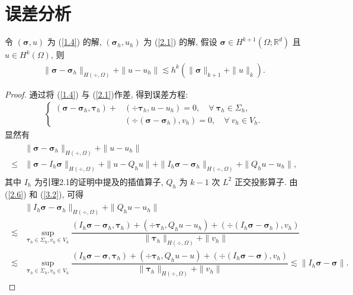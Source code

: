 \section{误差分析}
\begin{theorem}\label{th3.1}
令 $(\boldsymbol\sigma, u)$ 为 (\ref{1.4}) 的解, $(\boldsymbol\sigma_h, u_h)$ 为 (\ref{2.1}) 的解, 假设 $\boldsymbol\sigma\in H^{k+1}(\Omega;\mathbb{R}^d)$ 且 $u\in H^{k}(\Omega)$, 则
\begin{align}
\label{3.1}
\|\boldsymbol\sigma-\boldsymbol\sigma_h\|_{H(\div,\Omega)}+\|u-u_h\|\lesssim h^k(\|\boldsymbol\sigma\|_{k+1}+\|u\|_k).
\end{align}
\end{theorem}
\begin{proof}
通过将 (\ref{1.4}) 与 (\ref{2.1})作差, 得到误差方程:
\begin{align}
\label{3.2}
\left\{
\begin{array}{ll}
(\boldsymbol\sigma-\boldsymbol\sigma_h, \boldsymbol\tau_h)+&(\div\boldsymbol\tau_h, u-u_h) = 0, \quad \forall \ \boldsymbol\tau_h\in\Sigma_h, \\
&(\div(\boldsymbol\sigma-\boldsymbol\sigma_h), v_h) = 0, \quad \forall \ v_h\in V_h.
\end{array}
\right.
\end{align}
显然有
\begin{align}\begin{split}
\label{3.3}
&\|\boldsymbol\sigma-\boldsymbol\sigma_h\|_{H(\div,\Omega)}+\|u-u_h\|\\
\leq&\|\boldsymbol\sigma-I_h\boldsymbol\sigma\|_{H(\div,\Omega)}+\|u-Q_h u\|+\|I_h\boldsymbol\sigma-\boldsymbol\sigma_h\|_{H(\div,\Omega)}+\|Q_h u-u_h\|,
\end{split}
\end{align}
其中 $I_h$ 为引理2.1的证明中提及的插值算子, $Q_h$ 为 $k-1$ 次 $L^2$ 正交投影算子. 由 (\ref{2.6}) 和 (\ref{3.2}), 可得
\begin{align}\begin{split}
\label{3.4}
&\|I_h\boldsymbol\sigma-\boldsymbol\sigma_h\|_{H(\div,\Omega)}+\|Q_h u-u_h\|\\
\lesssim&\sup_{\boldsymbol\tau_h\in \Sigma_h, v_h\in V_h}\dfrac{(I_h\boldsymbol\sigma-\boldsymbol\sigma_h,\boldsymbol\tau_h)+(\div\boldsymbol\tau_h, Q_h u-u_h)+(\div(I_h\boldsymbol\sigma-\boldsymbol\sigma_h),v_h)}{\|\boldsymbol\tau_h\|_{H(\div,\Omega)}+\|v_h\|}\\
\lesssim&\sup_{\boldsymbol\tau_h\in \Sigma_h, v_h\in V_h}\dfrac{(I_h\boldsymbol\sigma-\boldsymbol\sigma,\boldsymbol\tau_h)+(\div\boldsymbol\tau_h, Q_h u-u)+(\div(I_h\boldsymbol\sigma-\boldsymbol\sigma),v_h)}{\|\boldsymbol\tau_h\|_{H(\div,\Omega)}+\|v_h\|}\lesssim\|I_h\boldsymbol\sigma-\boldsymbol\sigma\|.

\end{split}
\end{align}
\end{proof}
